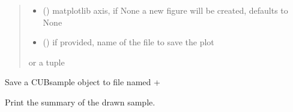 \documentclass[letterpaper,10pt,english]{sphinxmanual}
\begin{document}
\begin{fulllineitems}
\begin{fulllineitems}
\begin{quote}
\begin{description}
\begin{itemize}
\item {} 
\sphinxAtStartPar
{} (\sphinxstyleliteralemphasis{\sphinxupquote{, }}) \textendash{} matplotlib axis, if None a new figure will be created, defaults to None

\item {} 
\sphinxAtStartPar
{} () \textendash{} if provided, name of the file to save the plot

\end{itemize}

\sphinxAtStartPar
{} or a tuple 

\end{description}\end{quote}

\end{fulllineitems}


\begin{fulllineitems}
\label{\detokenize{cubmods:cubmods.smry.CUBsample.save}}
\pysigstartsignatures
{}
\pysigstopsignatures
\sphinxAtStartPar
Save a CUBsample object to file
named  + 

\end{fulllineitems}


\begin{fulllineitems}
\label{\detokenize{cubmods:cubmods.smry.CUBsample.summary}}
\pysigstartsignatures
{}
\pysigstopsignatures
\sphinxAtStartPar
Print the summary of the drawn sample.

\end{fulllineitems}


\end{fulllineitems}
\end{document}
